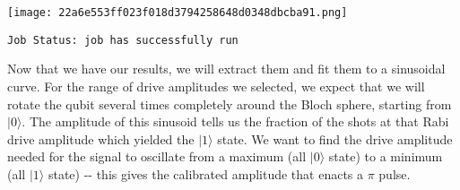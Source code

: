 \hypertarget{03cdd9a4-f3c3-44af-a07a-6b7133e20b09}{}
\begin{Shaded}
\begin{Highlighting}[]
\NormalTok{rabi\_schedules[}\NormalTok{].draw(backend}\OperatorTok{=}
\end{Highlighting}
\end{Shaded}

\texttt{[image: 22a6e553ff023f018d3794258648d0348dbcba91.png]}

\hypertarget{be62f139-c5cb-4592-9767-4768e145dd3f}{}
\begin{Shaded}
\begin{Highlighting}[]
\OperatorTok{=} 

\OperatorTok{=}
\OperatorTok{=}\NormalTok{, }
\OperatorTok{=}\NormalTok{, }
\OperatorTok{=}

\end{Highlighting}
\end{Shaded}

\begin{verbatim}
Job Status: job has successfully run
\end{verbatim}

\hypertarget{88c2d2be-f3c7-4ccc-b06e-0394779a9d66}{}
\begin{Shaded}
\begin{Highlighting}[]
\OperatorTok{=}\OperatorTok{=}\NormalTok{)}
\end{Highlighting}
\end{Shaded}

\leavevmode{}%
Now that we have our results, we will extract them and fit them to a
sinusoidal curve. For the range of drive amplitudes we selected, we
expect that we will rotate the qubit several times completely around the
Bloch sphere, starting from \(|0\rangle\). The amplitude of this
sinusoid tells us the fraction of the shots at that Rabi drive amplitude
which yielded the \(|1\rangle\) state. We want to find the drive
amplitude needed for the signal to oscillate from a maximum (all
\(|0\rangle\) state) to a minimum (all \(|1\rangle\) state) -\/- this
gives the calibrated amplitude that enacts a \(\pi\) pulse.

